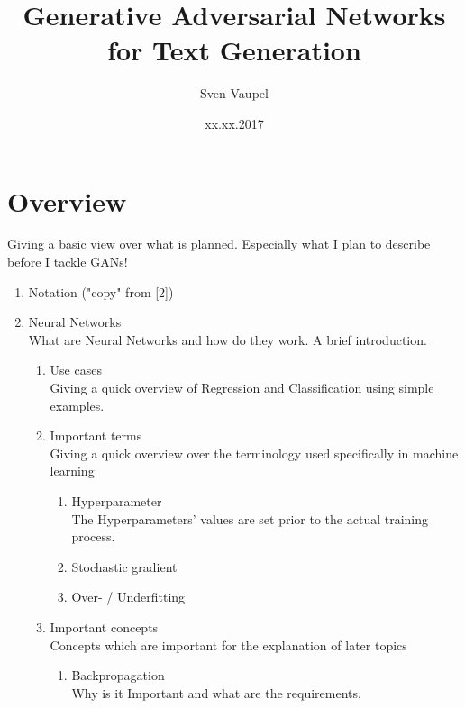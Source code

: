 \documentclass[12pt]{article}
\title{\textbf{Generative Adversarial Networks for Text Generation}}
\author{Sven Vaupel}
\date{xx.xx.2017}
\begin{document}
\maketitle
\setlength{\parindent}{0cm}

\section{Overview}

Giving a basic view over what is planned. Especially what I plan to describe before I tackle GANs!

\begin{enumerate}
  \item Notation ("copy" from [2])

  \item Neural Networks \\
    What are Neural Networks and how do they work. A brief introduction.

  \begin{enumerate}

    \item Use cases \\
      Giving a quick overview of Regression and Classification using simple examples.

    \item Important terms \\
      Giving a quick overview over the terminology used specifically in machine learning

      \begin{enumerate}

        \item Hyperparameter \\
          The Hyperparameters' values are set prior to the actual training process.

        \item Stochastic gradient

        \item Over- / Underfitting

      \end{enumerate}

    \item Important concepts \\
      Concepts which are important for the explanation of later topics

    \begin{enumerate}

      \item Backpropagation \\
        Why is it Important and what are the requirements.


\end{enumerate}
\end{enumerate}
\end{enumerate}
\end{document}
